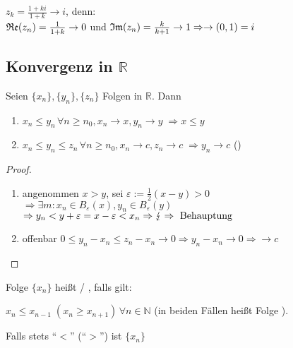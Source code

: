 \begin{example}
	$z_k=\frac{1+ki}{1+k}\to i$, denn: \\
	$\mathfrak{Re}(z_n)=\frac{1}{1+k}\to 0$ und $\mathfrak{Im}(z_n)=\frac{k}{k+1}\to 1\Rightarrow\to (0,1)=i$
\end{example}

\subsection{Konvergenz in \texorpdfstring{$\mathbb{R}$}{R}}
\begin{proposition}
	Seien $\{x_n\},\{y_n\},\{z_n\}$ Folgen in $\mathbb{R}$. Dann
	\begin{enumerate}[label={\arabic*)}]
		\item $x_n \le y_n\,\forall n\ge n_0, x_n\rightarrow x, y_n\rightarrow y\;\Rightarrow x\le y$
		\item $x_n\le y_n\le z_n\,\forall n\ge n_0, x_n\rightarrow c,z_n\rightarrow c \;\Rightarrow y_n\rightarrow c$ ()
	\end{enumerate}
\end{proposition}
\begin{proof}
	\begin{enumerate}
		\item angenommen $x>y$, sei $\varepsilon :=\frac{1}{2}(x-y)>0$ \\
		$\Rightarrow\exists m: x_n\in B_{\varepsilon}(x), y_n\in B_{\varepsilon}(y)$ \\
		$\Rightarrow y_n< y+\varepsilon=x-\varepsilon<x_n\Rightarrow\lightning\Rightarrow \text{ Behauptung}$
		\item offenbar $0\le y_n-x_n\le z_n-x_n\to 0\Rightarrow y_n-x_n\to 0\Rightarrow\to c$
	\end{enumerate}
\end{proof}

\begin{*definition}[monoton]
	Folge $\{x_n\}$ heißt  / , falls gilt:
	
	$x_n \le x_{n-1}\;(x_n\ge x_{n+1})\,\forall n\in\mathbb{N}$ (in beiden Fällen heißt Folge ).
	
	Falls stets "`$<$"' ("`$>$"') ist $\{x_n\}$ 
\end{*definition}

